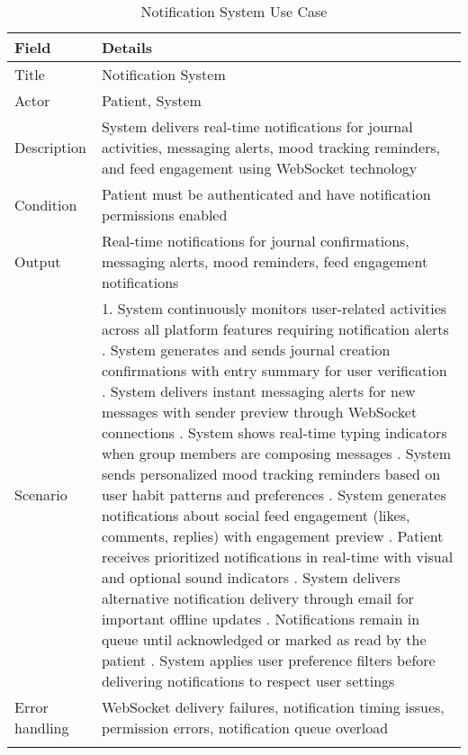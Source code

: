 \begin{longtable}{|p{3cm}|p{12cm}|}
\hline
\textbf{Field} & \textbf{Details} \\
\hline
Title & Notification System \\
\hline
Actor & Patient, System \\
\hline
Description & System delivers real-time notifications for journal activities, messaging alerts, mood tracking reminders, and feed engagement using WebSocket technology \\
\hline
Condition & Patient must be authenticated and have notification permissions enabled \\
\hline
Output & Real-time notifications for journal confirmations, messaging alerts, mood reminders, feed engagement notifications \\
\hline
Scenario & 1. System continuously monitors user-related activities across all platform features requiring notification alerts \newline 2. System generates and sends journal creation confirmations with entry summary for user verification \newline 3. System delivers instant messaging alerts for new messages with sender preview through WebSocket connections \newline 4. System shows real-time typing indicators when group members are composing messages \newline 5. System sends personalized mood tracking reminders based on user habit patterns and preferences \newline 6. System generates notifications about social feed engagement (likes, comments, replies) with engagement preview \newline 7. Patient receives prioritized notifications in real-time with visual and optional sound indicators \newline 8. System delivers alternative notification delivery through email for important offline updates \newline 9. Notifications remain in queue until acknowledged or marked as read by the patient \newline 10. System applies user preference filters before delivering notifications to respect user settings \\
\hline
Error handling & WebSocket delivery failures, notification timing issues, permission errors, notification queue overload \\
\hline
\caption{Notification System Use Case}
\end{longtable}

